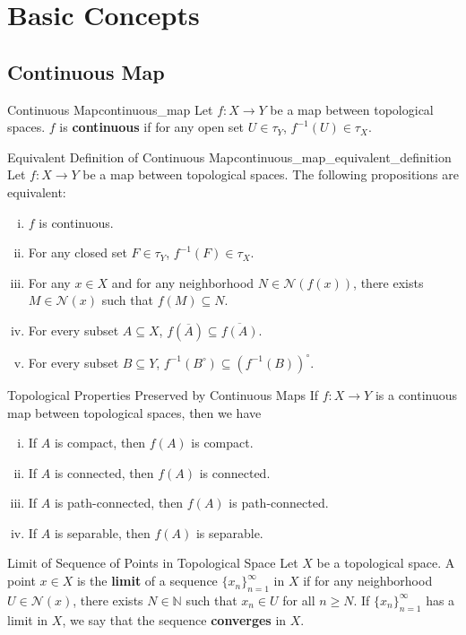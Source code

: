 \documentclass{report}
\begin{document}
\section{Basic Concepts}
\subsection{Continuous Map}

\begin{definition}{Continuous Map}{continuous_map}
	Let $f:X\to Y$ be a map between topological spaces. $f$ is \textbf{continuous} if for any open set $U\in\tau_Y$, $f^{-1}(U)\in\tau_X$.
\end{definition}

\begin{proposition}{Equivalent Definition of Continuous Map}{continuous_map_equivalent_definition}
	Let $f:X\to Y$ be a map between topological spaces. The following propositions are equivalent:
	\begin{enumerate}[(i)]
		\item $f$ is continuous.
		\item For any closed set $F\in\tau_Y$, $f^{-1}(F)\in\tau_X$.
		\item For any $x\in X$ and for any neighborhood $N\in\mathcal{N}(f(x))$, there exists $M\in\mathcal{N}(x)$ such that $f(M)\subseteq N$.
		\item For every subset $A\subseteq X$, $f(\overline{A})\subseteq \overline{f(A)}$.
		\item For every subset $B\subseteq Y$, $f^{-1}(B^\circ)\subseteq (f^{-1}(B))^\circ$.
	\end{enumerate}
\end{proposition}

\begin{proposition}{Topological Properties Preserved by Continuous Maps}{}
	If $f:X\to Y$ is a continuous map between topological spaces, then we have
	\begin{enumerate}[(i)]
		\item If $A$ is compact, then $f(A)$ is compact.
		\item If $A$ is connected, then $f(A)$ is connected.
		\item If $A$ is path-connected, then $f(A)$ is path-connected.
		\item If $A$ is separable, then $f(A)$ is separable.
	\end{enumerate}
\end{proposition}


\begin{definition}{Limit of Sequence of Points in Topological Space}{}
	Let $X$ be a topological space. A point $x\in X$ is the \textbf{limit} of a sequence $\{x_n\}_{n=1}^\infty$ in $X$ if for any neighborhood $U\in\mathcal{N}(x)$, there exists $N\in\mathbb{N}$ such that $x_n\in U$ for all $n\ge N$. If $\{x_n\}_{n=1}^\infty$ has a limit in $X$, we say that the sequence \textbf{converges} in $X$.
\end{definition}
\end{document}
